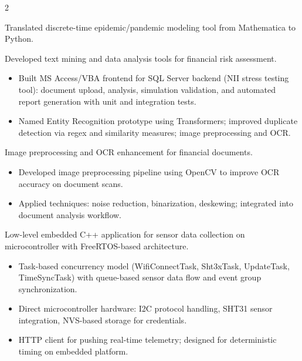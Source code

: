 \documentclass[10pt,a4paper,ragged2e,withhyper]{altacv}
\begin{document}
\begin{paracol}{2}
\par\divider


Translated discrete-time epidemic/pandemic modeling tool from Mathematica to Python.

\par\divider


Developed text mining and data analysis tools for financial risk assessment.

\begin{itemize}
\item Built MS Access/VBA frontend for SQL Server backend (NII stress testing tool): document upload, analysis, simulation validation, and automated report generation with unit and integration tests.
\item Named Entity Recognition prototype using Transformers; improved duplicate detection via regex and similarity measures; image preprocessing and OCR.
\end{itemize}

\par\divider


Image preprocessing and OCR enhancement for financial documents.

\begin{itemize}
\item Developed image preprocessing pipeline using OpenCV to improve OCR accuracy on document scans.
\item Applied techniques: noise reduction, binarization, deskewing; integrated into document analysis workflow.
\end{itemize}


\bigskip
{}
\label{sec:orgc376da6}

Low-level embedded C++ application for sensor data collection on microcontroller with FreeRTOS-based architecture.

\begin{itemize}
\item Task-based concurrency model (WifiConnectTask, Sht3xTask, UpdateTask, TimeSyncTask) with queue-based sensor data flow and event group synchronization.
\item Direct microcontroller hardware: I2C protocol handling, SHT31 sensor integration, NVS-based storage for credentials.
\item HTTP client for pushing real-time telemetry; designed for deterministic timing on embedded platform.
\end{itemize}


\end{paracol}
\end{document}
